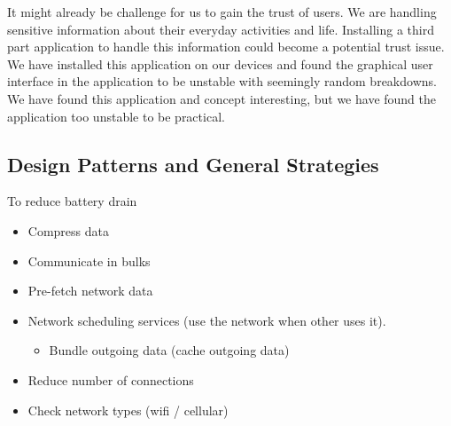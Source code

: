 It might already be challenge for us to gain the trust of users. We are handling sensitive information about their everyday activities and life. 
Installing a third part application to handle this information could become a potential trust issue. We have installed this application on our devices and found the graphical user interface in the application to be unstable with seemingly random breakdowns. We have found this application and concept interesting, but we have found the application too unstable to be practical.   

\subsection{Design Patterns and General Strategies}
\label{sub:design_patterns_and_general_strategies}

To reduce battery drain
\begin{itemize}
    \item Compress data
    \item Communicate in bulks
    \item Pre-fetch network data
    \item Network scheduling services (use the network when other uses it).
    \begin{itemize}
        \item Bundle outgoing data (cache outgoing data)
    \end{itemize}
    \item Reduce number of connections
    \item Check network types (wifi / cellular)
\end{itemize}

